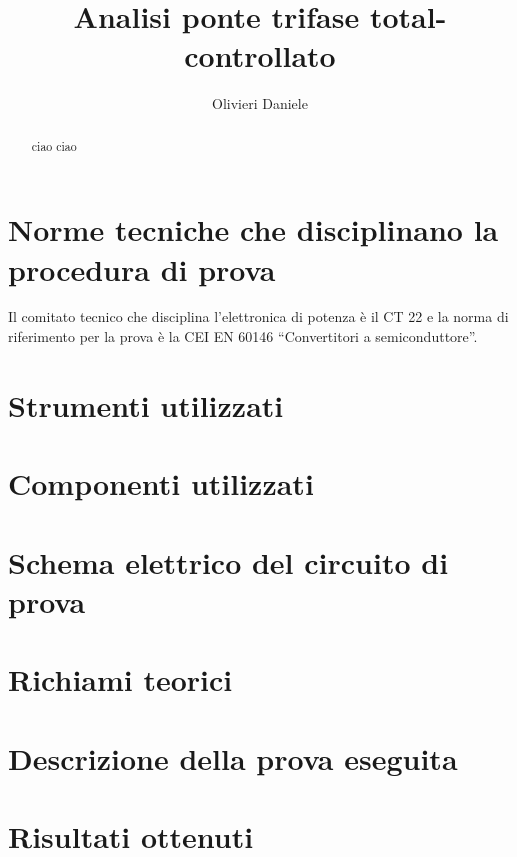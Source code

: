 \documentclass[a4paper,10pt]{article}
\title{Analisi ponte trifase total-controllato}
\author{Olivieri Daniele}
\date{}
\begin{document}
\maketitle

\begin{abstract}
 ciao ciao
\end{abstract}


\section{Norme tecniche che disciplinano la procedura di prova}
Il comitato tecnico che disciplina l'elettronica di potenza è il CT 22 e la norma
di riferimento per la prova è la CEI EN 60146 ``Convertitori a semiconduttore''.
\section{Strumenti utilizzati}

\section{Componenti utilizzati}

\section{Schema elettrico del circuito di prova}

\section{Richiami teorici}

\section{Descrizione della prova eseguita}

\section{Risultati ottenuti}
\end{document}

